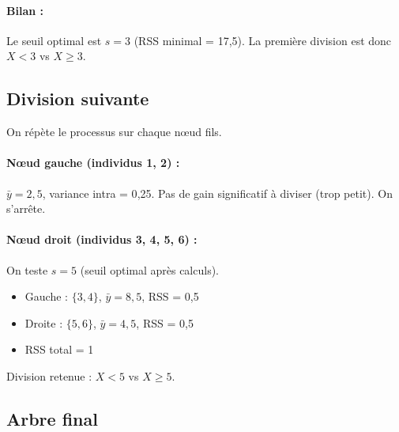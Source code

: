 \documentclass[a4paper,11pt]{article}
\begin{document}
\paragraph{Bilan :} Le seuil optimal est $s = 3$ (RSS minimal = 17{,}5). La première division est donc $X < 3$ vs $X \ge 3$.

\subsection{Division suivante}

On répète le processus sur chaque nœud fils.

\paragraph{Nœud gauche (individus 1, 2) :} $\bar{y} = 2{,}5$, variance intra = 0{,}25. Pas de gain significatif à diviser (trop petit). On s'arrête.

\paragraph{Nœud droit (individus 3, 4, 5, 6) :} On teste $s = 5$ (seuil optimal après calculs).
\begin{itemize}
    \item Gauche : $\{3,4\}$, $\bar{y}=8{,}5$, RSS = 0{,}5
    \item Droite : $\{5,6\}$, $\bar{y}=4{,}5$, RSS = 0{,}5
    \item RSS total = 1
\end{itemize}
Division retenue : $X < 5$ vs $X \ge 5$.

\subsection{Arbre final}
\end{document}
